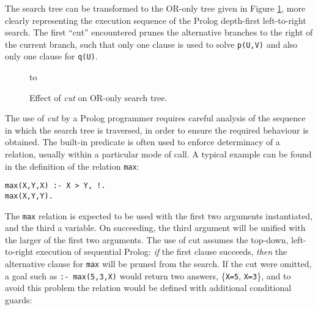 The search tree can be transformed to the OR-only tree given in Figure
\ref{cut_or_only_tree}, more clearly representing the execution
sequence of the Prolog depth-first left-to-right search.  The first
``cut'' encountered prunes the alternative branches to the right of
the current branch, such that only one clause is used to solve
\texttt{p(U,V)} and also only one clause for \texttt{q(U)}.

\begin{figure}[htb]
\vspace{5mm} \hbox to 
\caption{Effect of \textit{cut} on OR-only search tree.}
\vspace{5mm}
\label{cut_or_only_tree}
\end{figure}

The use of \textit{cut} by a Prolog programmer requires careful
analysis of the sequence in which the search tree is traversed, in
order to ensure the required behaviour is obtained.  The built-in
predicate is often used to enforce determinacy of a relation, usually
within a particular mode of call.  A typical example can be found in
the definition of the relation \texttt{max}:

\begin{verbatim}
max(X,Y,X) :- X > Y, !.
max(X,Y,Y).
\end{verbatim}
The \texttt{max} relation is expected to be used with the first two
arguments instantiated, and the third a variable.  On succeeding, the
third argument will be unified with the larger of the first two
arguments.  The use of cut assumes the top-down, left-to-right
execution of sequential Prolog: \textit{if} the first clause succeeds,
\textit{then} the alternative clause for \texttt{max} will be pruned
from the search.  If the cut were omitted, a goal such as \texttt{:-
max(5,3,X)} would return two answers, \{\texttt{X=5},
\texttt{X=3}\}, and to avoid this problem the relation would be defined
with additional conditional guards:

